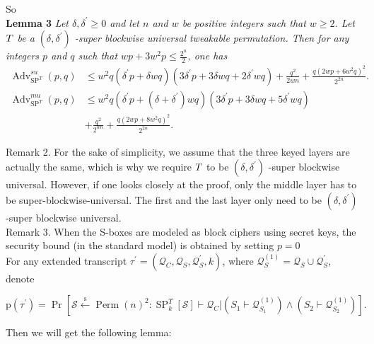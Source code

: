 \noindent So\\

\noindent \textbf{Lemma 3} \emph{Let $\delta, \delta^{\prime} \geq 0$ and let $\mathit{n}$ and $\mathit{w}$ be positive integers such that $\mathit{w} \geq 2$. Let $\mathnormal{T}$ be a $(\delta, \delta^{\prime})$ -super blockwise universal tweakable permutation. Then for any integers $\mathit{p}$ and $\mathit{q}$ such that  $wp+3w^2p \leq \frac{2^n}{2}$, one has}
$$
\begin{aligned}
\operatorname{Adv}_{\mathrm{SP}^{T}}^{su}(p, q) & \leq w^{2} q\left(\delta^{\prime} p+\delta w q\right)\left(3 \delta^{\prime} p+3 \delta w q+2 \delta^{\prime} w q\right)+\frac{q^{2}}{2 w n}+\frac{q\left(2 w p+6 w^{2} q\right)^{2}}{2^{2 n}}. \\
\operatorname{Adv}_{\mathrm{SP}^{T}}^{mu}(p, q) & \leq w^{2} q\left(\delta^{\prime} p+\left(\delta+\delta^{\prime}\right) w q\right)\left(3 \delta^{\prime} p+3 \delta w q+5 \delta^{\prime} w q\right) \\
&+\frac{q^{2}}{2^{w n}}+\frac{q\left(2 w p+8 w^{2} q\right)^{2}}{2^{2 n}}.
\end{aligned}
$$

\noindent Remark 2. For the sake of simplicity, we assume that the three keyed layers are actually the same, which is why we require $\mathnormal{T}$ to be $(\delta, \delta^{\prime})$ -super blockwise universal. However, if one looks closely at the proof, only the middle layer has to be super-blockwise-universal. The first and the last layer only need to be $(\delta, \delta^{\prime})$ -super blockwise universal.\\

\noindent Remark 3. When the S-boxes are modeled as block ciphers using secret keys, the security bound (in the standard model) is obtained by setting $\mathit{p} = 0$\\

For any  extended transcript $\tau^{\prime} = (\mathcal{Q}_C, \mathcal{Q}_S, \mathcal{Q}_S^{\prime},k)$, where $\mathcal{Q}_{S}^{(1)} = \mathcal{Q}_S \cup \mathcal{Q}_S^{\prime}$,  denote

$$
\mathrm{p}\left(\tau^{\prime}\right)=\operatorname{Pr}\left[\mathcal{S} \stackrel{\mathrm{s}}{\leftarrow} \operatorname{Perm}(n)^{2}: \mathrm{\operatorname{SP}}^{T}_{k}[\mathcal{S}] \vdash \mathcal{Q}_{C} |\left(S_{1} \vdash \mathcal{Q}_{S_{1}}^{(1)}\right) \wedge\left(S_{2} \vdash \mathcal{Q}_{S_{2}}^{(1)}\right)\right].
$$

Then we will get the following lemma:\\

